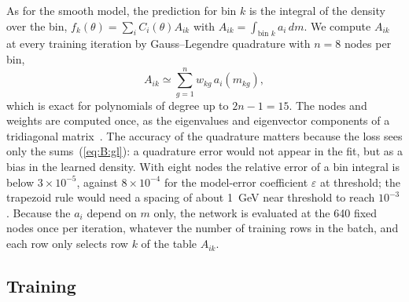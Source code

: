 As for the smooth model, the prediction for bin $k$ is the integral of the density over the bin,
$f_k(\theta) = \sum_i C_i(\theta)A_{ik}$ with $A_{ik} = \int_{\text{bin }k}a_i\,dm$. We compute $A_{ik}$ at every
training iteration by Gauss--Legendre quadrature with $n = 8$ nodes per bin,
\begin{equation}
  A_{ik} \simeq \sum_{g=1}^{n} w_{kg}\, a_i(m_{kg}),
  \label{eq:B:gl}
\end{equation}
which is exact for polynomials of degree up to $2n - 1 = 15$. The nodes and weights are computed once, as the
eigenvalues and eigenvector components of a tridiagonal matrix~\cite{Golub:1969}. The accuracy of the quadrature
matters because the loss sees only the sums~(\ref{eq:B:gl}): a quadrature error would not appear in the fit, but as a
bias in the learned density. With eight nodes the relative error of a bin integral is below $3\times10^{-5}$, against
$8\times10^{-4}$ for the model-error coefficient $\varepsilon$ at threshold; the trapezoid rule would need a spacing of
about 1~GeV near threshold to reach $10^{-3}$. Because the $a_i$ depend on $m$ only, the network is evaluated at the
640 fixed nodes once per iteration, whatever the number of training rows in the batch, and each row only selects
row $k$ of the table $A_{ik}$.

\subsection{Training}
\label{app:B:training}

